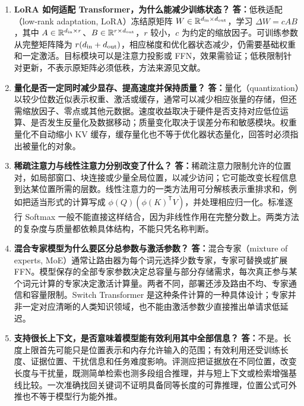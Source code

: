 \documentclass[UTF8,12pt,a4paper,fontset=fandol]{ctexart}
\begin{document}
\begin{enumerate}[resume*=trquestions]
\item \textbf{LoRA 如何适配 Transformer，为什么能减少训练状态？}
\textbf{答：}低秩适配（low-rank adaptation, LoRA）冻结原矩阵 $W\in\mathbb R^{d_{\rm in}\times d_{\rm out}}$，学习 $\Delta W=cAB$，其中 $A\in\mathbb R^{d_{\rm in}\times r}$、$B\in\mathbb R^{r\times d_{\rm out}}$，$r$ 较小，$c$ 为约定的缩放因子。可训练参数从完整矩阵降为 $r(d_{\rm in}+d_{\rm out})$，相应梯度和优化器状态减少，仍需要基础权重和一定激活。目标模块可以是注意力投影或 FFN，效果需验证；低秩限制针对更新，不表示原矩阵必须低秩，方法来源见文献\cite{hu2021}。

\item \textbf{量化是否一定同时减少显存、提高速度并保持质量？}
\textbf{答：}量化（quantization）以较少位数近似表示权重、激活或缓存，通常可以减少相应张量的存储，但还需缩放因子、零点或其他元数据。速度收益取决于硬件是否支持对应低位运算、是否发生反量化及数据移动；质量变化取决于误差分布和敏感模块。权重量化不自动缩小 KV 缓存，缓存量化也不等于优化器状态量化，回答时必须指出被量化的对象。

\item \textbf{稀疏注意力与线性注意力分别改变了什么？}
\textbf{答：}稀疏注意力限制允许的位置对，如局部窗口、块连接或少量全局位置，以减少访问；它可能改变长程信息到达某位置所需的层数。线性注意力的一类方法用可分解核表示重排求和，例如把适当形式的计算写成 $\phi(Q)(\phi(K)^{\mathsf T}V)$，并处理相应归一化。标准逐行 Softmax 一般不能直接这样结合，因为非线性作用在完整分数上。两类方法的复杂度与质量都依赖具体结构，不能只凭名称判断。

\item \textbf{混合专家模型为什么要区分总参数与激活参数？}
\textbf{答：}混合专家（mixture of experts, MoE）通常让路由器为每个词元选择少数专家，专家可替换或扩展 FFN。模型保存的全部专家参数决定总容量与部分存储需求，每次真正参与某个词元计算的专家决定激活计算量。两者不同，部署还涉及路由不均、专家通信和容量限制。Switch Transformer 是这种条件计算的一种具体设计\cite{fedus2021}；专家并非一定对应清晰的人类知识领域，也不能由激活参数少直接推出单请求低延迟。

\item \textbf{支持很长上下文，是否意味着模型能有效利用其中全部信息？}
\textbf{答：}不是。长度上限首先可能只是位置表示和内存允许输入的范围；有效利用还受训练长度、证据位置、干扰信息和任务难度影响。评测应把证据放在不同位置，改变长度与干扰量，既测简单检索也测多段组合推理，并与短上下文或检索增强基线比较。一次准确找回关键词不证明具备同等长度的可靠推理，位置公式可外推也不等于模型行为能外推。


\end{enumerate}
\end{document}

